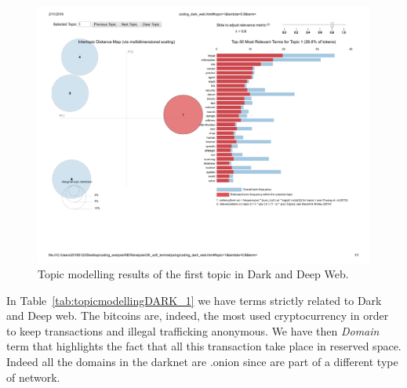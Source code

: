 \begin{figure}[h!]
\begin{center}
\includegraphics[scale=0.5]{./img/DARKDEEP_topic1.pdf}
\end{center}
\caption{Topic modelling results of the first topic in Dark and Deep Web.}
\label{fig:topicmodellingDARK_1}
\end{figure}

In Table~\ref{tab:topicmodellingDARK_1} we have terms strictly related to Dark and Deep web. The bitcoins are, indeed, the most used cryptocurrency in order to keep transactions and illegal trafficking anonymous. We have then \emph{Domain} term that highlights the fact that all this transaction take place in reserved space. Indeed all the domains in the darknet are .onion since are part of a different type of network. 







\begin{table}[h!]
\caption{Topic analysis results of the second topic for Dark and Deep Web.}
\label{tab:topicmodellingDARK_2}
\end{table}



